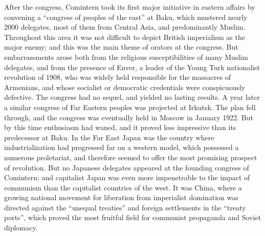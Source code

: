 After the congress, Comintern took its first major initiative in eastern affairs by convening a ``congress of peoples of the east'' at Baku, which mustered nearly 2000 delegates, most of them from Central Asia, and predominantly Muslim. Throughout this area it was not difficult to depict British imperialism as the major enemy; and this was the main theme of orators at the congress. But embarrassments arose both from the religious susceptibilities of many Muslim delegates, and from the presence of Enver, a leader of the Young Turk nationalist revolution of 1908, who was widely held responsible for the massacres of Armenians, and whose socialist or democratic credentials were conspicuously defective. The congress had no sequel, and yielded no lasting results. A year later a similar congress of Far Eastern peoples was projected at Irkutsk. The plan fell through, and the congress was eventually held in Moscow in January 1922. But by this time enthusiasm had waned, and it proved less impressive than its predecessor at Baku. In the Far East Japan was the country where industrialization had progressed far on a western model, which possessed a numerous proletariat, and therefore seemed to offer the most promising prospect of revolution. But no Japanese delegates appeared at the founding congress of Comintern; and capitalist Japan was even more impenetrable to the impact of communism than the capitalist countries of the west. It was China, where a growing national movement for liberation from imperialist domination was directed against the ``unequal treaties'' and foreign settlements in the ``treaty ports'', which proved the most fruitful field for communist propaganda and Soviet diplomacy. 

